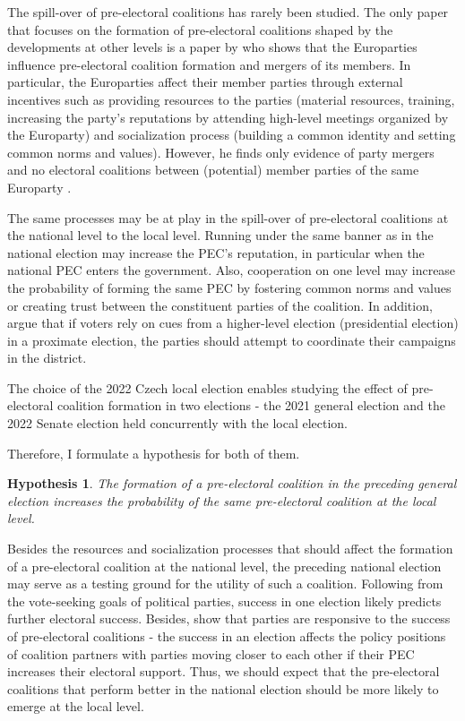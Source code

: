 \documentclass[fignum,12pt,titlepage]{article}
\newtheorem{hypo}{Hypothesis}
\begin{document}
The spill-over of pre-electoral coalitions has rarely been studied. The only paper that focuses on the formation of pre-electoral coalitions shaped by the developments at other levels is a paper by \textcite{ibenskas2020} who shows that the Europarties influence pre-electoral coalition formation and mergers of its members. In particular, the Europarties affect their member parties through external incentives such as providing resources to the parties (material resources, training, increasing the party's reputations by attending high-level meetings organized by the Europarty) and socialization process (building a common identity and setting common norms and values). However, he finds only evidence of party mergers and no electoral coalitions between (potential) member parties of the same Europarty \parencite{ibenskas2020}.

The same processes may be at play in the spill-over of pre-electoral coalitions at the national level to the local level. Running under the same banner as in the national election may increase the PEC's reputation, in particular when the national PEC enters the government. Also, cooperation on one level may increase the probability of forming the same PEC by fostering common norms and values or creating trust between the constituent parties of the coalition. In addition, \textcite{hicken2011} argue that if voters rely on cues from a higher-level election (presidential election) in a proximate election, the parties should attempt to coordinate their campaigns in the district.

The choice of the 2022 Czech local election enables studying the effect of pre-electoral coalition formation in two elections - the 2021 general election and the 2022 Senate election held concurrently with the local election. 

Therefore, I formulate a hypothesis for both of them.

\begin{hypo}
{The formation of a pre-electoral coalition in the preceding general election increases the probability of the same pre-electoral coalition at the local level.\label{hyp:1}}
\end{hypo}

Besides the resources and socialization processes that should affect the formation of a pre-electoral coalition at the national level, the preceding national election may serve as a testing ground for the utility of such a coalition. Following from the vote-seeking goals of political parties, success in one election likely predicts further electoral success. Besides, \textcite{greene2017} show that parties are responsive to the success of pre-electoral coalitions - the success in an election affects the policy positions of coalition partners with parties moving closer to each other if their PEC increases their electoral support. Thus, we should expect that the pre-electoral coalitions that perform better in the national election should be more likely to emerge at the local level.  
\end{document}
